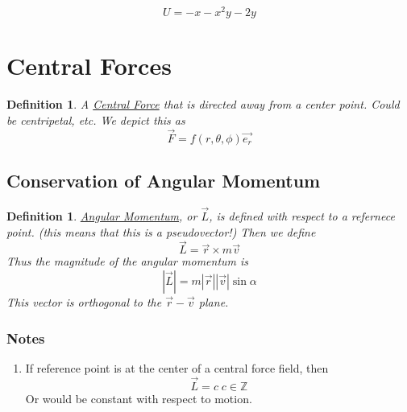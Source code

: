 \documentclass{article}
\newtheorem{definition}[theorem]{Definition}
\newtheorem{one minute paper}[theorem]{One Minute Paper}
\begin{document}
\begin{equation}
    U = -x - x^2y - 2y
\end{equation}

\section*{Central Forces}

\begin{definition}
    A \underline{Central Force} that is directed away from a center point. Could be centripetal, etc. We depict this as 
    \begin{equation}
        \vec{F} = f(r,\theta,\phi)\vec{e_r}
    \end{equation}
\end{definition}

\subsection*{Conservation of Angular Momentum}

\begin{definition}
    \underline{Angular Momentum}, or $\vec{L}$, is defined with respect to a refernece point. (this means that this is a pseudovector!) Then we define 
    \begin{equation}
        \vec{L} = \vec{r} \times m\vec{v}
    \end{equation}
    Thus the magnitude of the angular momentum is 
    \begin{equation}
        |\vec{L}| = m|\vec{r}||\vec{v}|\sin\alpha
    \end{equation}
    This vector is orthogonal to the $\vec{r}-\vec{v}$ plane. 
\end{definition}

\subsubsection*{Notes}

\begin{enumerate}
    \item If reference point is at the center of a central force field, then
    \begin{equation}
        \vec{L} = c \; c \in \mathbb{Z}
    \end{equation}
    Or would be constant with respect to motion.
\end{enumerate}
\end{document}
